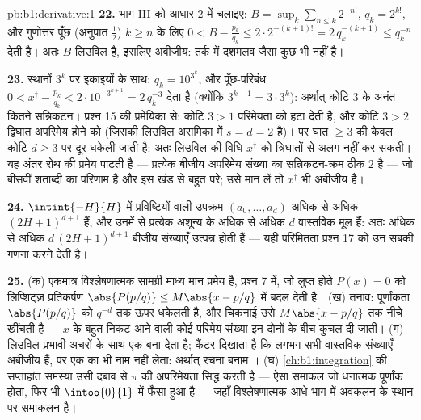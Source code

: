 \begin{solution}{pb:b1:derivative:1}
\textbf{22.} भाग III को आधार $2$ में चलाइए: $B = \sup_k \sum_{n\leq k}
2^{-n!}$, $q_k = 2^{k!}$, और गुणोत्तर पूँछ (अनुपात $\frac12$) $k \geq n$ के
लिए $0 < B - \frac{p_k}{q_k} \leq 2\cdot2^{-(k+1)!} = 2\,q_k^{-(k+1)} \leq
q_k^{-n}$ देती है। अतः $B$ लिउविल है, इसलिए अबीजीय: तर्क में दशमलव जैसा कुछ
भी नहीं है।

\textbf{23.} स्थानों $3^k$ पर इकाइयों के साथ: $q_k = 10^{3^k}$, और
पूँछ-परिबंध $0 < x^\dagger - \frac{p_k}{q_k} < 2\cdot10^{-3^{k+1}} =
2\,q_k^{-3}$ देता है (क्योंकि $3^{k+1} = 3\cdot3^k$): अर्थात् कोटि $3$ के
अनंत कितने सन्निकटन। प्रश्न 15 की प्रमेयिका से: कोटि $3 > 1$ परिमेयता को हटा
देती है, और कोटि $3 > 2$ द्विघात अपरिमेय होने को (जिसकी लिउविल असमिका में $s
= d = 2$ है)। पर घात $\geq 3$ की  केवल कोटि $d \geq 3$ पर दूर
धकेली जाती है: अतः लिउविल की विधि $x^\dagger$ को त्रिघातों से अलग नहीं कर
सकती। यह अंतर रोथ की प्रमेय पाटती है --- प्रत्येक बीजीय अपरिमेय संख्या का
सन्निकटन-क्रम ठीक $2$ है --- जो बीसवीं शताब्दी का परिणाम है और इस खंड से
बहुत परे; उसे मान लें तो $x^\dagger$ भी अबीजीय है।

\textbf{24.} $\intint{-H}{H}$ में प्रविष्टियों वाली उपक्रम $(a_0, \dots,
a_d)$ अधिक से अधिक $(2H+1)^{d+1}$ हैं, और उनमें से प्रत्येक अशून्य  के
अधिक से अधिक $d$ वास्तविक मूल हैं: अतः अधिक से अधिक $d\,(2H+1)^{d+1}$ बीजीय
संख्याएँ उत्पन्न होती हैं --- यही परिमितता प्रश्न 17 को उन सबकी गणना करने
देती है।

\textbf{25.} (क) एकमात्र विश्लेषणात्मक सामग्री माध्य मान प्रमेय है, प्रश्न 7
में, जो लुप्त होते $P(x) = 0$ को लिप्शिट्ज़ प्रतिकर्षण $\abs{P(p/q)} \leq
M\abs{x - p/q}$ में बदल देती है। (ख) तनाव: पूर्णांकता $\abs{P(p/q)}$ को
$q^{-d}$ तक ऊपर धकेलती है, और चिकनाई उसे $M\abs{x - p/q}$ तक नीचे खींचती है
--- $x$ के बहुत निकट आने वाली कोई परिमेय संख्या इन दोनों के बीच कुचल दी
जाती। (ग) लिउविल प्रभावी अचरों के साथ एक  बना देता है; कैंटर
दिखाता है कि लगभग सभी वास्तविक संख्याएँ अबीजीय हैं, पर एक का भी नाम नहीं
लेता: अर्थात् रचना बनाम । (घ) \cref{ch:b1:integration} की सप्ताहांत
समस्या उसी दबाव से $\pi$ की अपरिमेयता सिद्ध करती है --- ऐसा समाकल जो धनात्मक
पूर्णांक होता, फिर भी $\intoo{0}{1}$ में फँसा हुआ है --- जहाँ विश्लेषणात्मक
आधे भाग में अवकलन के स्थान पर समाकलन है।
\end{solution}

